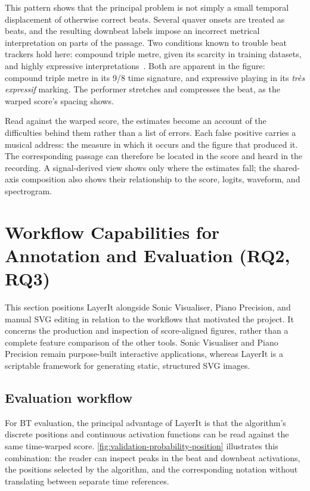 This pattern shows that the principal problem is not simply a small temporal displacement of otherwise correct beats. Several quaver onsets are treated as beats, and the resulting downbeat labels impose an incorrect metrical interpretation on parts of the passage. Two conditions known to trouble beat trackers hold here: compound triple metre, given its scarcity in training datasets, and highly expressive interpretations~\cite{pinto2021TappingDifficultOnes}. Both are apparent in the figure: compound triple metre in its 9/8 time signature, and expressive playing in its \emph{tr\`es expressif} marking. The performer stretches and compresses the beat, as the warped score's spacing shows.

Read against the warped score, the estimates become an account of the difficulties behind them rather than a list of errors. Each false positive carries a musical address: the measure in which it occurs and the figure that produced it. The corresponding passage can therefore be located in the score and heard in the recording. A signal-derived view shows only where the estimates fall; the shared-axis composition also shows their relationship to the score, logits, waveform, and spectrogram.

\section{Workflow Capabilities for Annotation and Evaluation (RQ2, RQ3)}

This section positions LayerIt alongside Sonic Visualiser, Piano Precision, and manual SVG editing in relation to the workflows that motivated the project. It concerns the production and inspection of score-aligned figures, rather than a complete feature comparison of the other tools. Sonic Visualiser and Piano Precision remain purpose-built interactive applications, whereas LayerIt is a scriptable framework for generating static, structured SVG images.

\subsection{Evaluation workflow}

For BT evaluation, the principal advantage of LayerIt is that the algorithm's discrete positions and continuous activation functions can be read against the same time-warped score. \autoref{fig:validation-probability-position} illustrates this combination: the reader can inspect peaks in the beat and downbeat activations, the positions selected by the algorithm, and the corresponding notation without translating between separate time references.

